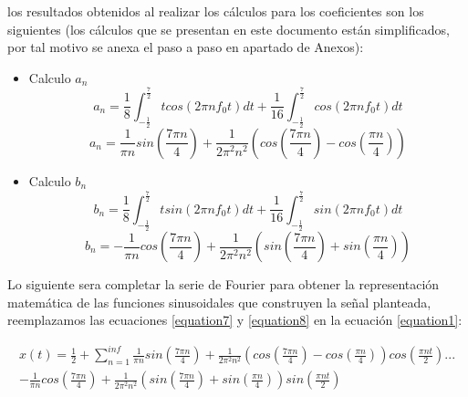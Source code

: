 \documentclass[12pt]{article}
\begin{document}
    los resultados obtenidos al realizar los cálculos para los coeficientes son los siguientes (los cálculos que 
    se presentan en este documento están simplificados, por tal motivo se anexa el paso a paso en apartado de 
    Anexos):\\

    \begin{itemize}
        \item Calculo $a_{n}$
            \begin{equation*}
                a_{n}=\frac{1}{8}\int_{-\frac{1}{2}}^{\frac{7}{2}} tcos(2\pi nf_0t)dt + 
                \frac{1}{16} \int_{-\frac{1}{2}}^{\frac{7}{2}} cos(2\pi nf_0t)dt
            \end{equation*}
            \begin{equation}
                a_{n}=\frac{1}{\pi n} sin\left(\frac{7\pi n}{4}\right)+\frac{1}{2\pi^2 n^2}\left(cos\left(\frac{7\pi n}{4}\right)-cos\left(\frac{\pi n}{4}\right)\right)
                \label{equation7}
            \end{equation}
        \item Calculo $b_{n}$
            \begin{equation*}
                b_{n}=\frac{1}{8}\int_{-\frac{1}{2}}^{\frac{7}{2}} tsin(2\pi nf_0t)dt + 
                \frac{1}{16} \int_{-\frac{1}{2}}^{\frac{7}{2}} sin(2\pi nf_0t)dt
            \end{equation*}
            \begin{equation}
                b_{n}=-\frac{1}{\pi n} cos\left(\frac{7\pi n}{4}\right)+\frac{1}{2\pi^2 n^2}\left(sin\left(\frac{7\pi n}{4}\right)+sin\left(\frac{\pi n}{4}\right)\right)
                \label{equation8}
            \end{equation}
    \end{itemize}
    
    Lo siguiente sera completar la serie de Fourier para obtener la representación matemática de las funciones sinusoidales 
    que construyen la señal planteada, reemplazamos las ecuaciones \ref{equation7} y \ref{equation8} en la ecuación 
    \ref{equation1}:

    \begin{multline}
        x(t)=\frac{1}{2}+\sum_{n=1}^{inf} \frac{1}{\pi n} sin\left(\frac{7\pi n}{4}\right)+\frac{1}{2\pi^2 n^2}\left(cos\left(\frac{7\pi n}{4}\right)-cos\left(\frac{\pi n}{4}\right)\right)
        cos\left(\frac{\pi nt}{2}\right)...\\ -\frac{1}{\pi n} cos\left(\frac{7\pi n}{4}\right)+\frac{1}{2\pi^2 n^2}\left(sin\left(\frac{7\pi n}{4}\right)+sin\left(\frac{\pi n}{4}\right)\right)
        sin\left(\frac{\pi nt}{2}\right)
        \label{equation1}
    \end{multline}
\end{document}
